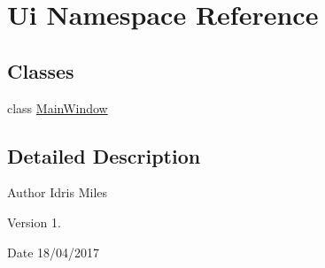 \hypertarget{namespaceUi}{}\section{Ui Namespace Reference}
\label{namespaceUi}
\subsection*{Classes}
\begin{DoxyCompactItemize}
\item 
class \hyperlink{classUi_1_1MainWindow}{Main\+Window}
\end{DoxyCompactItemize}


\subsection{Detailed Description}
\begin{DoxyAuthor}{Author}
Idris Miles 
\end{DoxyAuthor}
\begin{DoxyVersion}{Version}
1. 
\end{DoxyVersion}
\begin{DoxyDate}{Date}
18/04/2017 
\end{DoxyDate}
